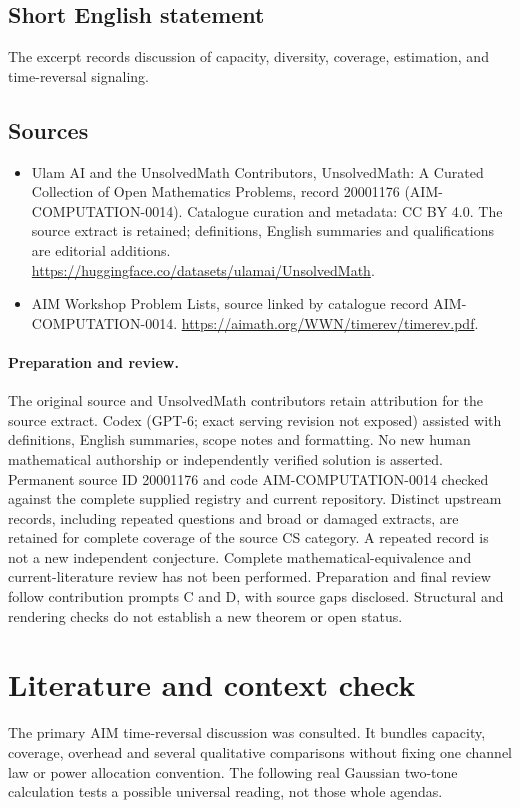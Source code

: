 \documentclass[11pt]{article}
\begin{document}
\subsection{Short English statement}
The excerpt records discussion of capacity, diversity, coverage, estimation, and time-reversal signaling.
\subsection{Sources}
\begin{itemize}
\item[S1] Ulam AI and the UnsolvedMath Contributors, UnsolvedMath: A Curated Collection of Open Mathematics Problems, record 20001176 (AIM-COMPUTATION-0014). Catalogue curation and metadata: CC BY 4.0. The source extract is retained; definitions, English summaries and qualifications are editorial additions.
\url{https://huggingface.co/datasets/ulamai/UnsolvedMath}.
\item[S2] AIM Workshop Problem Lists, source linked by catalogue record AIM-COMPUTATION-0014.
\url{https://aimath.org/WWN/timerev/timerev.pdf}.
\end{itemize}
\paragraph{Preparation and review.}
The original source and UnsolvedMath contributors retain attribution for the source extract. Codex (GPT-6; exact serving revision not exposed) assisted with definitions, English summaries, scope notes and formatting. No new human mathematical authorship or independently verified solution is asserted. Permanent source ID 20001176 and code AIM-COMPUTATION-0014 checked against the complete supplied registry and current repository. Distinct upstream records, including repeated questions and broad or damaged extracts, are retained for complete coverage of the source CS category. A repeated record is not a new independent conjecture. Complete mathematical-equivalence and current-literature review has not been performed. Preparation and final review follow contribution prompts C and D, with source gaps disclosed. Structural and rendering checks do not establish a new theorem or open status.
\label{end:20001176}

\section{Literature and context check}
The primary AIM time-reversal discussion was consulted. It bundles capacity,
coverage, overhead and several qualitative comparisons without fixing one
channel law or power allocation convention. The following real Gaussian
two-tone calculation tests a possible universal reading, not those whole agendas.
\end{document}
